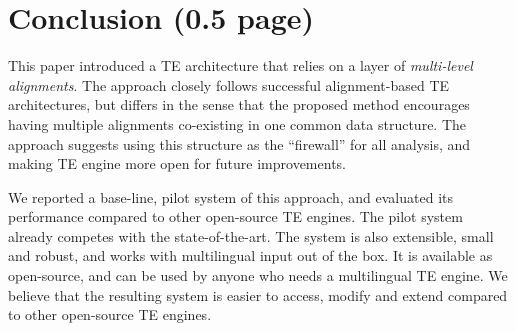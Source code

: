 \documentclass[11pt,letterpaper]{article}
\begin{document}
\section{Conclusion (0.5 page)}
This paper introduced a TE architecture that relies on a layer of
{\em multi-level alignments}. The approach closely follows successful  
alignment-based TE architectures, but differs in the sense that the
proposed method encourages having multiple alignments co-existing in 
one common data structure. The approach suggests using this structure
as the ``firewall'' for all analysis, and making TE engine more open
for future improvements.

We reported a base-line, pilot system of this approach, and evaluated
its performance compared to other open-source TE engines. The pilot
system already competes with the state-of-the-art. The system is
also extensible, small and robust, and works with multilingual input
out of the box. It is available as open-source, and can be used by
anyone who needs a multilingual TE engine. We believe that the
resulting system is easier to access, modify and extend compared to
other open-source TE engines.



\end{document}
